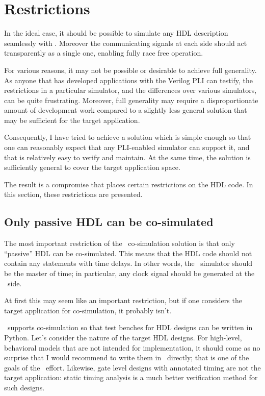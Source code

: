 \section{Restrictions}

In the ideal case, it should be possible to simulate
any HDL description seamlessly with \myhdl{}. Moreover
the communicating signals at each side should act
transparently as a single one, enabling fully race free
operation.

For various reasons, it may not be possible or desirable
to achieve full generality. As anyone that has developed
applications with the Verilog PLI can testify, the
restrictions in a particular simulator, and the 
differences over various simulators, can be quite 
frustrating. Moreover, full generality may require
a disproportionate amount of development work compared
to a slightly less general solution that may
be sufficient for the target application.

Consequently, I have tried to achieve a solution
which is simple enough so that one can reasonably 
expect that any PLI-enabled simulator can support it,
and that is relatively easy to verify and maintain.
At the same time, the solution is sufficiently general 
to cover the target application space.

The result is a compromise that places certain restrictions
on the HDL code. In this section, these restrictions 
are presented.

\subsection{Only passive HDL can be co-simulated}

The most important restriction of the \myhdl\ co-simulation solution is
that only ``passive'' HDL can be co-simulated.  This means that the HDL
code should not contain any statements with time delays. In other
words, the \myhdl\ simulator should be the master of time; in
particular, any clock signal should be generated at the \myhdl\ side.

At first this may seem like an important restriction, but if one
considers the target application for co-simulation, it probably
isn't. 

\myhdl\ supports co-simulation so that test benches for HDL
designs can be written in Python.  Let's consider the nature of the
target HDL designs. For high-level, behavioral models that are not
intended for implementation, it should come as no surprise that I
would recommend to write them in \myhdl\ directly; that is one of the
goals of the \myhdl\ effort. Likewise, gate level designs with
annotated timing are not the target application: static timing
analysis is a much better verification method for such designs.

